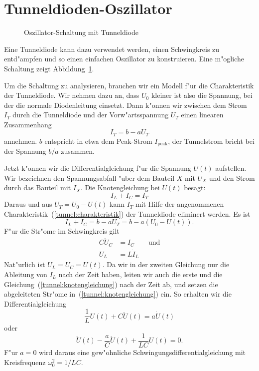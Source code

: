 %
%
%
\section{Tunneldioden-Oszillator}
\begin{figure}
\centering

\caption{Oszillator-Schaltung mit Tunneldiode
\label{tunnel:tunneldioden-oszillator}}
\end{figure}
Eine Tunneldiode kann dazu verwendet werden, einen Schwingkreis zu
entd"ampfen und so einen einfachen Oszillator zu konstruieren.
Eine m"ogliche Schaltung zeigt Abbildung~\ref{tunnel:tunneldioden-oszillator}.

Um die Schaltung zu analysieren, brauchen wir ein Modell f"ur die
Charakteristik der Tunneldiode. Wir nehmen dazu an, dass $U_0$ kleiner
ist also die Spannung, bei der die normale Diodenleitung einsetzt.
Dann k"onnen wir zwischen dem Strom $I_T$ durch die Tunneldiode
und der Vorw"artsspannung $U_T$ einen linearen Zusammenhang
\begin{equation}
I_T=b-aU_T
\label{tunnel:charakteristik}
\end{equation}
annehmen. $b$ entspricht in etwa dem Peak-Strom $I_{\text{peak}}$, der
Tunnelstrom bricht bei der Spannung $b/a$ zusammen.

Jetzt k"onnen wir die Differentialgleichung f"ur die Spannung $U(t)$
aufstellen. Wir bezeichnen den Spannungsabfall "uber dem Bauteil $X$
mit $U_X$ und den Strom durch das Bauteil mit $I_X$. Die Knotengleichung
bei $U(t)$ besagt:
\[
I_L+I_C=I_T
\]
Daraus und aus $U_T=U_0-U(t)$ kann $I_T$ mit Hilfe der angenommenen
Charakteristik~(\ref{tunnel:charakteristik}) der Tunneldiode eliminert werden.
Es ist
\begin{equation}
I_L+I_C=b-aU_T=b-a(U_0-U(t)).
\label{tunnel:knotengleichung}
\end{equation}
F"ur die Str"ome im Schwingkreis gilt
\begin{align*}
C\dot U_C&=I_C \qquad\text{und}\\
U_L&=L\dot I_L
\end{align*}
Nat"urlich ist $U_L=U_C=U(t)$.
Da wir in der zweiten Gleichung nur die Ableitung von $I_L$ nach
der Zeit haben, leiten wir
auch die erste und die Gleichung~(\ref{tunnel:knotengleichung}) nach
der Zeit ab, und setzen die abgeleiteten Str"ome
in~(\ref{tunnel:knotengleichung}) ein.
So erhalten wir die Differentialgleichung
\begin{equation*}
\frac1{L}U(t) +C\ddot U(t)=a\dot U(t)
\end{equation*}
oder
\begin{equation}
\ddot U(t)
-\frac{a}{C}\dot U(t)
+\frac1{LC}U(t)
=0.
\label{tunnel:dgl1}
\end{equation}
F"ur $a=0$ wird daraus eine gew"ohnliche Schwingungsdifferentialgleichung
mit Kreisfrequenz $\omega_0^2=1/LC$.

